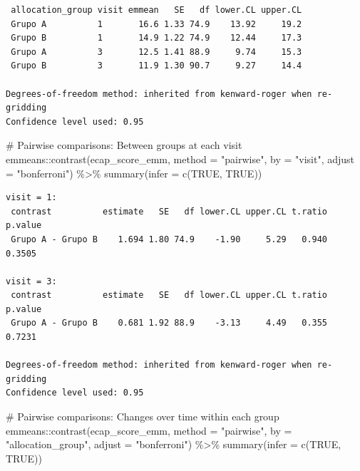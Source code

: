 \documentclass[
  letterpaper,
  DIV=11,
  numbers=noendperiod]{scrartcl}
\newenvironment{Shaded}{\begin{snugshade}}{\end{snugshade}}
\newcommand{\AttributeTok}[1]{\textcolor[rgb]{0.40,0.45,0.13}{#1}}
\newcommand{\CommentTok}[1]{\textcolor[rgb]{0.37,0.37,0.37}{#1}}
\newcommand{\ConstantTok}[1]{\textcolor[rgb]{0.56,0.35,0.01}{#1}}
\newcommand{\FunctionTok}[1]{\textcolor[rgb]{0.28,0.35,0.67}{#1}}
\newcommand{\NormalTok}[1]{\textcolor[rgb]{0.00,0.23,0.31}{#1}}
\newcommand{\SpecialCharTok}[1]{\textcolor[rgb]{0.37,0.37,0.37}{#1}}
\newcommand{\StringTok}[1]{\textcolor[rgb]{0.13,0.47,0.30}{#1}}
\begin{document}
\begin{verbatim}
 allocation_group visit emmean   SE   df lower.CL upper.CL
 Grupo A          1       16.6 1.33 74.9    13.92     19.2
 Grupo B          1       14.9 1.22 74.9    12.44     17.3
 Grupo A          3       12.5 1.41 88.9     9.74     15.3
 Grupo B          3       11.9 1.30 90.7     9.27     14.4

Degrees-of-freedom method: inherited from kenward-roger when re-gridding 
Confidence level used: 0.95 
\end{verbatim}

\begin{Shaded}
\begin{Highlighting}[]
\CommentTok{\# Pairwise comparisons: Between groups at each visit}
\NormalTok{emmeans}\SpecialCharTok{::}\FunctionTok{contrast}\NormalTok{(ecap\_score\_emm, }\AttributeTok{method =} \StringTok{"pairwise"}\NormalTok{, }\AttributeTok{by =} \StringTok{"visit"}\NormalTok{, }\AttributeTok{adjust =} \StringTok{"bonferroni"}\NormalTok{) }\SpecialCharTok{\%\textgreater{}\%} \FunctionTok{summary}\NormalTok{(}\AttributeTok{infer =} \FunctionTok{c}\NormalTok{(}\ConstantTok{TRUE}\NormalTok{, }\ConstantTok{TRUE}\NormalTok{))}
\end{Highlighting}
\end{Shaded}

\begin{verbatim}
visit = 1:
 contrast          estimate   SE   df lower.CL upper.CL t.ratio p.value
 Grupo A - Grupo B    1.694 1.80 74.9    -1.90     5.29   0.940  0.3505

visit = 3:
 contrast          estimate   SE   df lower.CL upper.CL t.ratio p.value
 Grupo A - Grupo B    0.681 1.92 88.9    -3.13     4.49   0.355  0.7231

Degrees-of-freedom method: inherited from kenward-roger when re-gridding 
Confidence level used: 0.95 
\end{verbatim}

\begin{Shaded}
\begin{Highlighting}[]
\CommentTok{\# Pairwise comparisons: Changes over time within each group}
\NormalTok{emmeans}\SpecialCharTok{::}\FunctionTok{contrast}\NormalTok{(ecap\_score\_emm, }\AttributeTok{method =} \StringTok{"pairwise"}\NormalTok{, }\AttributeTok{by =} \StringTok{"allocation\_group"}\NormalTok{, }\AttributeTok{adjust =} \StringTok{"bonferroni"}\NormalTok{) }\SpecialCharTok{\%\textgreater{}\%} \FunctionTok{summary}\NormalTok{(}\AttributeTok{infer =} \FunctionTok{c}\NormalTok{(}\ConstantTok{TRUE}\NormalTok{, }\ConstantTok{TRUE}\NormalTok{))}
\end{Highlighting}
\end{Shaded}
\end{document}
